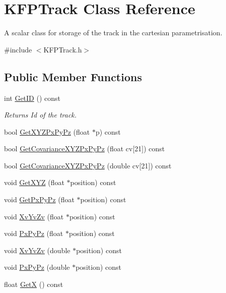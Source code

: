\hypertarget{classKFPTrack}{}\section{K\+F\+P\+Track Class Reference}
\label{classKFPTrack}


A scalar class for storage of the track in the cartesian parametrisation.  




{\ttfamily \#include $<$K\+F\+P\+Track.\+h$>$}

\subsection*{Public Member Functions}
\begin{DoxyCompactItemize}
\item 
int \hyperlink{classKFPTrack_a8d74655c104b6ee95d8cde2e0a10f091}{Get\+ID} () const \hypertarget{classKFPTrack_a8d74655c104b6ee95d8cde2e0a10f091}{}\label{classKFPTrack_a8d74655c104b6ee95d8cde2e0a10f091}

\begin{DoxyCompactList}\small\item\em Returns Id of the track. \end{DoxyCompactList}\item 
bool \hyperlink{classKFPTrack_a096ae252f6c0a83704896a4587076dc8}{Get\+X\+Y\+Z\+Px\+Py\+Pz} (float $\ast$p) const 
\item 
bool \hyperlink{classKFPTrack_adcb29beece55806f5fdbc740d31de90f}{Get\+Covariance\+X\+Y\+Z\+Px\+Py\+Pz} (float cv\mbox{[}21\mbox{]}) const 
\item 
bool \hyperlink{classKFPTrack_aba503f301fc0ad25eaf2b815514633c6}{Get\+Covariance\+X\+Y\+Z\+Px\+Py\+Pz} (double cv\mbox{[}21\mbox{]}) const 
\item 
void \hyperlink{classKFPTrack_a48c96dc9976b48fccf6eaadf8f31241a}{Get\+X\+YZ} (float $\ast$position) const 
\item 
void \hyperlink{classKFPTrack_ab4c776a3db93987d2c5298034fe3ea23}{Get\+Px\+Py\+Pz} (float $\ast$position) const 
\item 
void \hyperlink{classKFPTrack_a898efd7d653aa2a2c82f92c80cc3875f}{Xv\+Yv\+Zv} (float $\ast$position) const 
\item 
void \hyperlink{classKFPTrack_a4073f2dd7d0cb17a47906c352026855f}{Px\+Py\+Pz} (float $\ast$position) const 
\item 
void \hyperlink{classKFPTrack_adffcfd62628fcd28ed7068edb5505fec}{Xv\+Yv\+Zv} (double $\ast$position) const 
\item 
void \hyperlink{classKFPTrack_a92544f10b694cbde96d12d52f466492a}{Px\+Py\+Pz} (double $\ast$position) const 
\item 
float \hyperlink{classKFPTrack_a1975006b69521908be3c3684e9842fb9}{GetX} () const \hypertarget{classKFPTrack_a1975006b69521908be3c3684e9842fb9}{}\label{classKFPTrack_a1975006b69521908be3c3684e9842fb9}


\end{DoxyCompactItemize}
